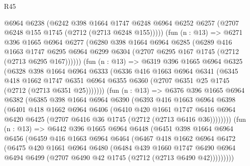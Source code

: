 \begin{lexlean}{R45}
\begin{coremodule}
          @6964
          @6238
          (@6242
            @398
            @1664
            @1747
            @6248
            @6964
            @6252
            @6257
            (@2707 @6248 @155 @1745 (@2712 (@2713 @6248 @155)))))
        (fun (n : @13) =>
        @6271
          @396
          @1665
          @6964
          @6277
          (@6280
            @398
            @1664
            @6964
            @6285
            (@6289
              @416
              @1663
              @1747
              @6295
              @6964
              @6299
              @6304
              (@2707 @6295 @167 @1745 (@2712 (@2713 @6295 @167))))))
        (fun (n : @13) =>
        @6319
          @396
          @1665
          @6964
          @6325
          (@6328
            @398
            @1664
            @6964
            @6333
            (@6336
              @416
              @1663
              @6964
              @6341
              (@6345
                @418
                @1662
                @1747
                @6351
                @6964
                @6355
                @6360
                (@2707 @6351 @25 @1745 (@2712 (@2713 @6351 @25)))))))
        (fun (n : @13) =>
        @6376
          @396
          @1665
          @6964
          @6382
          (@6385
            @398
            @1664
            @6964
            @6390
            (@6393
              @416
              @1663
              @6964
              @6398
              (@6401
                @418
                @1662
                @6964
                @6406
                (@6410
                  @420
                  @1661
                  @1747
                  @6416
                  @6964
                  @6420
                  @6425
                  (@2707 @6416 @36 @1745 (@2712 (@2713 @6416 @36))))))))
        (fun (n : @13) =>
        @6442
          @396
          @1665
          @6964
          @6448
          (@6451
            @398
            @1664
            @6964
            @6456
            (@6459
              @416
              @1663
              @6964
              @6464
              (@6467
                @418
                @1662
                @6964
                @6472
                (@6475
                  @420
                  @1661
                  @6964
                  @6480
                  (@6484
                    @439
                    @1660
                    @1747
                    @6490
                    @6964
                    @6494
                    @6499
                    (@2707 @6490 @42 @1745 (@2712 (@2713 @6490 @42)))))))))

\end{coremodule}
\end{lexlean}
